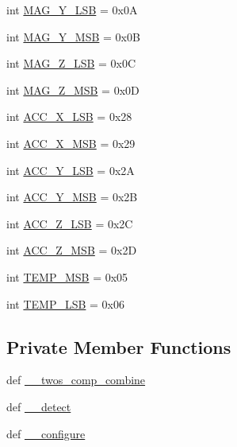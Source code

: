 \begin{DoxyCompactItemize}
int \hyperlink{classconcretesensor_1_1lsm303dMagnetometer_1_1LSM303DMagnetometer_a657aea1a2608423f0ed581069b3d3b53}{M\+A\+G\+\_\+\+Y\+\_\+\+L\+S\+B} = 0x0\+A
\item 
int \hyperlink{classconcretesensor_1_1lsm303dMagnetometer_1_1LSM303DMagnetometer_afd299702f078cdcb0d962942608a8f9f}{M\+A\+G\+\_\+\+Y\+\_\+\+M\+S\+B} = 0x0\+B
\item 
int \hyperlink{classconcretesensor_1_1lsm303dMagnetometer_1_1LSM303DMagnetometer_aec7df92a860c0ad8617251cd26fdb183}{M\+A\+G\+\_\+\+Z\+\_\+\+L\+S\+B} = 0x0\+C
\item 
int \hyperlink{classconcretesensor_1_1lsm303dMagnetometer_1_1LSM303DMagnetometer_ae8d92c8ed39206da2c1224c9a4386264}{M\+A\+G\+\_\+\+Z\+\_\+\+M\+S\+B} = 0x0\+D
\item 
int \hyperlink{classconcretesensor_1_1lsm303dMagnetometer_1_1LSM303DMagnetometer_ae7fd046e57bef1b71e7a3ce615cafa28}{A\+C\+C\+\_\+\+X\+\_\+\+L\+S\+B} = 0x28
\item 
int \hyperlink{classconcretesensor_1_1lsm303dMagnetometer_1_1LSM303DMagnetometer_ad883b86badd975a51a0a19bd91f7c17c}{A\+C\+C\+\_\+\+X\+\_\+\+M\+S\+B} = 0x29
\item 
int \hyperlink{classconcretesensor_1_1lsm303dMagnetometer_1_1LSM303DMagnetometer_afd894b21fa8c54b6cbb5a21b302d1824}{A\+C\+C\+\_\+\+Y\+\_\+\+L\+S\+B} = 0x2\+A
\item 
int \hyperlink{classconcretesensor_1_1lsm303dMagnetometer_1_1LSM303DMagnetometer_a66dbb10c6e62b813188bd31c981a7a01}{A\+C\+C\+\_\+\+Y\+\_\+\+M\+S\+B} = 0x2\+B
\item 
int \hyperlink{classconcretesensor_1_1lsm303dMagnetometer_1_1LSM303DMagnetometer_a76f785d5306f8d1119b2cf1a3699768e}{A\+C\+C\+\_\+\+Z\+\_\+\+L\+S\+B} = 0x2\+C
\item 
int \hyperlink{classconcretesensor_1_1lsm303dMagnetometer_1_1LSM303DMagnetometer_aa6598730cbbcb16c25eb655dea254979}{A\+C\+C\+\_\+\+Z\+\_\+\+M\+S\+B} = 0x2\+D
\item 
int \hyperlink{classconcretesensor_1_1lsm303dMagnetometer_1_1LSM303DMagnetometer_a22b827cc18c5f535bdbfc4dc32c5adc9}{T\+E\+M\+P\+\_\+\+M\+S\+B} = 0x05
\item 
int \hyperlink{classconcretesensor_1_1lsm303dMagnetometer_1_1LSM303DMagnetometer_ac2a5e3eb06625ae97f5b71c9d8c98d7f}{T\+E\+M\+P\+\_\+\+L\+S\+B} = 0x06
\end{DoxyCompactItemize}
\subsection*{Private Member Functions}
\begin{DoxyCompactItemize}
\item 
def \hyperlink{classconcretesensor_1_1lsm303dMagnetometer_1_1LSM303DMagnetometer_a05cbd17fe63ba330e92fb0009c290b0e}{\+\_\+\+\_\+twos\+\_\+comp\+\_\+combine}
\item 
def \hyperlink{classconcretesensor_1_1lsm303dMagnetometer_1_1LSM303DMagnetometer_aae51b381eef082b4495d4e035724d07a}{\+\_\+\+\_\+detect}
\item 
def \hyperlink{classconcretesensor_1_1lsm303dMagnetometer_1_1LSM303DMagnetometer_a7ed2374889a270728a27709e008e01f5}{\+\_\+\+\_\+configure}
\end{DoxyCompactItemize}
